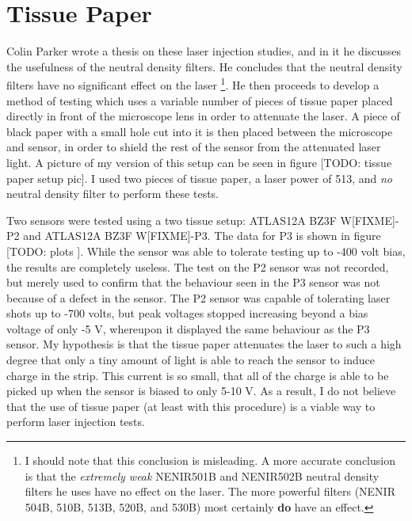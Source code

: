 \documentclass{report}
\begin{document}
        \section{Tissue Paper}
            Colin Parker wrote a thesis on these laser injection studies, and in it he discusses the usefulness of the neutral density filters. He concludes that the neutral density filters have no significant effect on the laser \footnote{I should note that this conclusion is misleading. A more accurate conclusion is that the \textit{extremely weak} NENIR501B and NENIR502B neutral density filters he uses have no effect on the laser. The more powerful filters (NENIR 504B, 510B, 513B, 520B, and 530B) most certainly \textbf{do} have an effect.}. He then proceeds to develop a method of testing which uses a variable number of pieces of tissue paper placed directly in front of the microscope lens in order to attenuate the laser. A piece of black paper with a small hole cut into it is then placed between the microscope and sensor, in order to shield the rest of the sensor from the attenuated laser light. A picture of my version of this setup can be seen in figure [TODO: tissue paper setup pic]. I used two pieces of tissue paper, a laser power of 513, and \textit{no} neutral density filter to perform these tests.

            Two sensors were tested using a two tissue setup: ATLAS12A BZ3F W[FIXME]-P2 and ATLAS12A BZ3F W[FIXME]-P3. The data for P3 is shown in figure [TODO: plots
            ]. While the sensor was able to tolerate testing up to -400 volt bias, the results are completely useless. The test on the P2 sensor was not recorded, but merely used to confirm that the behaviour seen in the P3 sensor was not because of a defect in the sensor. The P2 sensor was capable of tolerating laser shots up to -700 volts, but peak voltages stopped increasing beyond a bias voltage of only -5 V, whereupon it displayed the same behaviour as the P3 sensor. My hypothesis is that the tissue paper attenuates the laser to such a high degree that only a tiny amount of light is able to reach the sensor to induce charge in the strip. This current is so small, that all of the charge is able to be picked up when the sensor is biased to only 5-10 V. As a result, I do not believe that the use of tissue paper (at least with this procedure) is a viable way to perform laser injection tests.
\end{document}
